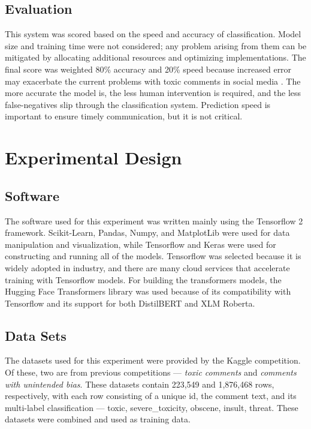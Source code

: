 \documentclass{article}
\begin{document}
\subsection{Evaluation}

This system was scored based on the speed and accuracy of classification. Model size and training time were not considered; any problem arising from them can be mitigated by allocating additional resources and optimizing implementations. The final score was weighted 80\% accuracy and 20\% speed because increased error may exacerbate the current problems with toxic comments in social media \cite{10.1145/3200947.3208069}. The more accurate the model is, the less human intervention is required, and the less false-negatives slip through the classification system. Prediction speed is important to ensure timely communication, but it is not critical.

\section{Experimental Design}

\subsection{Software}

The software used for this experiment was written mainly using the Tensorflow 2 framework. Scikit-Learn, Pandas, Numpy, and MatplotLib were used for data manipulation and visualization, while Tensorflow and Keras were used for constructing and running all of the models. Tensorflow was selected because it is widely adopted in industry, and there are many cloud services that accelerate training with Tensorflow models. For building the transformers models, the Hugging Face Transformers library was used because of its compatibility with Tensorflow and its support for both DistilBERT and XLM Roberta.

\subsection{Data Sets}

The datasets used for this experiment were provided by the Kaggle competition. Of these, two are from previous competitions --- \textit{toxic comments} and \textit{comments with unintended bias}. These datasets contain 223,549 and 1,876,468 rows, respectively, with each row consisting of a unique id, the comment text, and its multi-label classification --- toxic, severe\_toxicity, obscene, insult, threat. These datasets were combined and used as training data.
\end{document}
